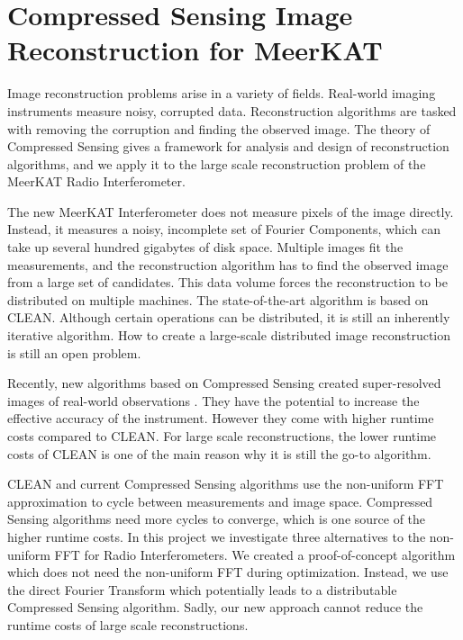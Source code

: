 \section{Compressed Sensing Image Reconstruction for MeerKAT} \label{intro}
Image reconstruction problems arise in a variety of fields. Real-world imaging instruments measure noisy, corrupted data. Reconstruction algorithms are tasked with removing the corruption and finding the observed image. The theory of Compressed Sensing\cite{candes2006robust, donoho2006compressed} gives a framework for analysis and design of reconstruction algorithms, and we apply it to the large scale reconstruction problem of the MeerKAT Radio Interferometer.

The new MeerKAT Interferometer does not measure pixels of the image directly. Instead, it measures a noisy, incomplete set of Fourier Components, which can take up several hundred gigabytes of disk space. Multiple images fit the measurements, and the reconstruction algorithm has to find the observed image from a large set of candidates. This data volume forces the reconstruction to be distributed on multiple machines. The state-of-the-art algorithm is based on CLEAN\cite{rich2008multi, rau2011multi}. Although certain operations can be distributed\cite{offringa2014wsclean}, it is still an inherently iterative algorithm. How to create a large-scale distributed image reconstruction is still an open problem.

Recently, new algorithms based on Compressed Sensing created super-resolved images of real-world observations \cite{girard2015sparse, dabbech2018cygnus}. They have the potential to increase the effective accuracy of the instrument. However they come with higher runtime costs compared to CLEAN. For large scale reconstructions, the lower runtime costs of CLEAN is one of the main reason why it is still the go-to algorithm.

CLEAN and current Compressed Sensing algorithms use the non-uniform FFT approximation\cite{kunisnonequispaced, pratley2017robust} to cycle between measurements and image space. Compressed Sensing algorithms need more cycles to converge, which is one source of the higher runtime costs. In this project we investigate three alternatives to the non-uniform FFT for Radio Interferometers. We created a proof-of-concept algorithm which does not need the non-uniform FFT during optimization. Instead, we use the direct Fourier Transform which potentially leads to a distributable Compressed Sensing algorithm. Sadly, our new approach cannot reduce the runtime costs of large scale reconstructions.

